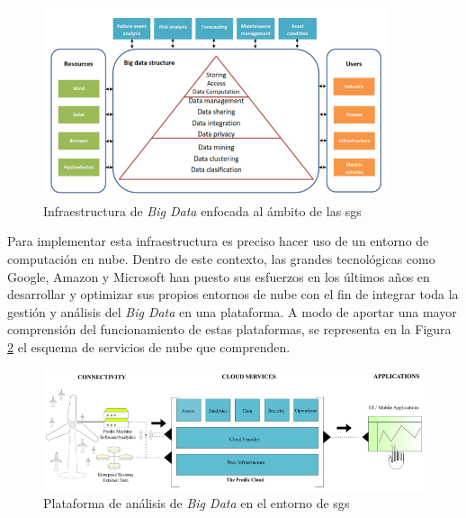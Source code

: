 \begin{figure}[h!]
  \centering
  \includegraphics[width=0.9\textwidth]{img/teoria/bigdata2.png}
  \caption{Infraestructura de \textit{Big Data} enfocada al ámbito de las \gls{sg}s \cite{stab}}
  \label{fig:bigdata2}
\end{figure}

Para implementar esta infraestructura es preciso hacer uso de un entorno de computación en nube. Dentro de este contexto, las grandes tecnológicas como Google, Amazon y Microsoft han puesto sus esfuerzos en los últimos años en desarrollar y optimizar sus propios entornos de nube con el fin de integrar toda la gestión y análisis del \textit{Big Data} en una plataforma. A modo de aportar una mayor comprensión del funcionamiento de estas plataformas, se representa en la Figura \ref{fig:bigdata} el esquema de servicios de nube que comprenden.

\begin{figure}[h!]
  \centering
  \includegraphics[width=1\textwidth]{img/teoria/bigdata.png}
  \caption{Plataforma de análisis de \textit{Big Data} en el entorno de \gls{sg}s \cite{bigdata}}
  \label{fig:bigdata}
\end{figure}

\vspace{3mm}









